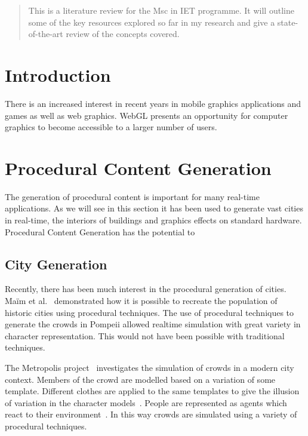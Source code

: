 \documentclass[12pt]{article}
\begin{document}
\maketitle

\clearpage

\begin{abstract}
This is a literature review for the Msc in IET programme.
It will outline some of the key resources explored so far in my research and give a state-of-the-art review of the concepts covered.
\end{abstract}

\clearpage

\section{Introduction}
There is an increased interest in recent years in mobile graphics applications and games as well as web graphics.
WebGL presents an opportunity for computer graphics to become accessible to a larger number of users.

\section{Procedural Content Generation}
The generation of procedural content is important for many real-time applications. 
As we will see in this section it has been used to generate vast cities in real-time, the interiors of buildings and graphics effects on standard hardware.
Procedural Content Generation has the potential to 

\subsection{City Generation}
Recently, there has been much interest in the procedural generation of cities.
Ma\"{i}m et al.~\cite{maim2007populating} demonstrated how it is possible to recreate the population of historic cities using procedural techniques.
The use of procedural techniques to generate the crowds in Pompeii allowed realtime simulation with great variety in character representation.
This would not have been possible with traditional techniques.

The Metropolis project~\cite{web:metropolis} investigates the simulation of crowds in a modern city context.
Members of the crowd are modelled based on a variation of some template.
Different clothes are applied to the same templates to give the illusion of variation in the character models~\cite{mcdonnell2007pipeline}.
People are represented as agents which react to their environment~\cite{ulicny2002towards}.
In this way crowds are simulated using a variety of procedural techniques.
\end{document}
